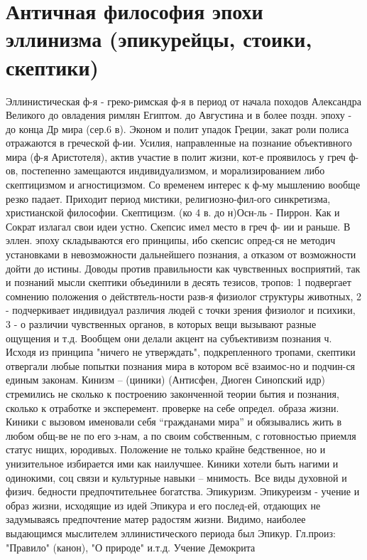 \documentclass[12pt]{article}
\begin{document}
\newpage
\section{Античная философия эпохи эллинизма (эпикурейцы, стоики, скептики)}
Эллинистическая ф-я - греко-римская ф-я в период от начала походов Александра Великого до овладения
римлян Египтом. до Августина и в более поздн. эпоху - до конца Др мира (сер.6 в). 
Эконом и полит упадок Греции, закат роли полиса отражаются в греческой ф-ии. Усилия, направленные на
познание объективного мира (ф-я Аристотеля), актив участие в полит жизни, кот-е проявилось у греч ф-ов,
постепенно  замещаются  индивидуализмом,  и  морализированием  либо  скептицизмом  и  агностицизмом.  Со
временем интерес к ф-му мышлению вообще резко падает. Приходит период мистики, религиозно-фил-ого
синкретизма, христианской философии. 
Скептицизм. (ко 4 в. до н)Осн-ль - Пиррон. Как и Сократ излагал свои идеи устно. Скепсис имел место в греч ф-
ии и раньше. В эллен. эпоху складываются его принципы, ибо скепсис опред-ся не методич установками в
невозможности  дальнейшего  познания,  а  отказом  от  возможности  дойти  до  истины.  Доводы  против
правильности как чувственных восприятий, так и познаний мысли скептики объединили в десять тезисов,
тропов: 
1 подвергает сомнению положения о действтель-ности разв-я физиолог структуры животных, 
2 - подчеркивает индивидуал различия людей с точки зрения физиолог и психики, 
3 - о различии чувственных органов, в которых вещи вызывают разные ощущения и т.д. Вообщем они делали
акцент на субъективизм познания ч. Исходя из принципа "ничего не утверждать", подкрепленного тропами,
скептики отвергали любые попытки познания мира в котором всё взаимос-но и подчин-ся единым законам. 
Кинизм – (циники) (Антисфен, Диоген Синопский идр) стремились не сколько к построению законченной
теории бытия и познания, сколько к отработке и эксперемент. проверке на себе определ. образа жизни. Киники с
вызовом именовали себя “гражданами мира” и обязывались жить в любом общ-ве не по его з-нам, а по своим
собственным, с готовностью приемля статус нищих, юродивых. Положение не только крайне бедственное, но и
унизительное избирается ими как наилучшее. Киники хотели быть нагими и одинокими, соц связи и культурные
навыки – мнимость. Все виды духовной и физич. бедности предпочтительнее богатства. 
Эпикуризм. Эпикуреизм - учение и образ жизни, исходящие из идей Эпикура и его послед-ей, отдающих не
задумываясь  предпочтение  матер  радостям  жизни.  Видимо,  наиболее  выдающимся  мыслителем
эллинистического периода был Эпикур. Гл.произ: "Правило" (канон), "О природе" и.т.д. Учение Демокрита
\end{document}
